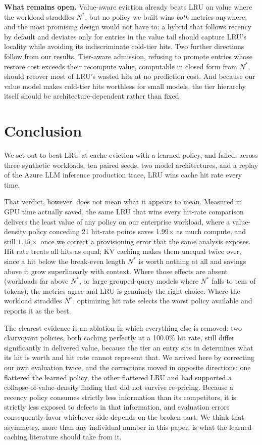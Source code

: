 \documentclass[letterpaper,twocolumn,10pt]{article}
\begin{document}
\textbf{What remains open.} Value-aware eviction already beats LRU on value where the workload straddles $N^{*}$, but no policy we built wins \emph{both} metrics anywhere, and the most promising design would not have to: a hybrid that follows recency by default and deviates only for entries in the value tail should capture LRU's locality while avoiding its indiscriminate cold-tier hits. Two further directions follow from our results. Tier-aware admission, refusing to promote entries whose restore cost exceeds their recompute value, computable in closed form from $N^{*}$, should recover most of LRU's wasted hits at no prediction cost. And because our value model makes cold-tier hits worthless for small models, the tier hierarchy itself should be architecture-dependent rather than fixed.

\section{Conclusion}

We set out to beat LRU at cache eviction with a learned policy, and failed: across three synthetic workloads, ten paired seeds, two model architectures, and a replay of the Azure LLM inference production trace, LRU wins cache hit rate every time.

That verdict, however, does not mean what it appears to mean. Measured in GPU time actually saved, the same LRU that wins every hit-rate comparison delivers the least value of any policy on our enterprise workload, where a value-density policy conceding 21 hit-rate points saves 1.99$\times$ as much compute, and still $1.15\times$ once we correct a provisioning error that the same analysis exposes. Hit rate treats all hits as equal; KV caching makes them unequal twice over, since a hit below the break-even length $N^{*}$ is worth nothing at all and savings above it grow superlinearly with context. Where those effects are absent (workloads far above $N^{*}$, or large grouped-query models where $N^{*}$ falls to tens of tokens), the metrics agree and LRU is genuinely the right choice. Where the workload straddles $N^{*}$, optimizing hit rate selects the worst policy available and reports it as the best.

The clearest evidence is an ablation in which everything else is removed: two clairvoyant policies, both caching perfectly at a 100.0\% hit rate, still differ significantly in delivered value, because the tier an entry sits in determines what its hit is worth and hit rate cannot represent that. We arrived here by correcting our own evaluation twice, and the corrections moved in opposite directions: one flattered the learned policy, the other flattered LRU and had supported a collapse-of-value-density finding that did not survive re-pricing. Because a recency policy consumes strictly less information than its competitors, it is strictly less exposed to defects in that information, and evaluation errors consequently favor whichever side depends on the broken part. We think that asymmetry, more than any individual number in this paper, is what the learned-caching literature should take from it.
\end{document}
